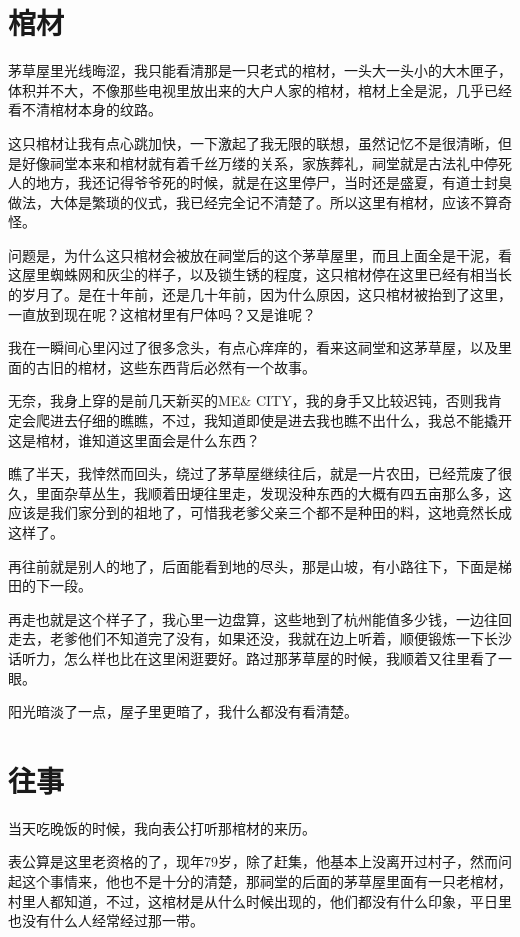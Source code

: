 \chapter{棺材}

茅草屋里光线晦涩，我只能看清那是一只老式的棺材，一头大一头小的大木匣子，体积并不大，不像那些电视里放出来的大户人家的棺材，棺材上全是泥，几乎已经看不清棺材本身的纹路。

这只棺材让我有点心跳加快，一下激起了我无限的联想，虽然记忆不是很清晰，但是好像祠堂本来和棺材就有着千丝万缕的关系，家族葬礼，祠堂就是古法礼中停死人的地方，我还记得爷爷死的时候，就是在这里停尸，当时还是盛夏，有道士封臭做法，大体是繁琐的仪式，我已经完全记不清楚了。所以这里有棺材，应该不算奇怪。

问题是，为什么这只棺材会被放在祠堂后的这个茅草屋里，而且上面全是干泥，看这屋里蜘蛛网和灰尘的样子，以及锁生锈的程度，这只棺材停在这里已经有相当长的岁月了。是在十年前，还是几十年前，因为什么原因，这只棺材被抬到了这里，一直放到现在呢？这棺材里有尸体吗？又是谁呢？

我在一瞬间心里闪过了很多念头，有点心痒痒的，看来这祠堂和这茅草屋，以及里面的古旧的棺材，这些东西背后必然有一个故事。

无奈，我身上穿的是前几天新买的ME\& CITY，我的身手又比较迟钝，否则我肯定会爬进去仔细的瞧瞧，不过，我知道即使是进去我也瞧不出什么，我总不能撬开这是棺材，谁知道这里面会是什么东西？

瞧了半天，我悻然而回头，绕过了茅草屋继续往后，就是一片农田，已经荒废了很久，里面杂草丛生，我顺着田埂往里走，发现没种东西的大概有四五亩那么多，这应该是我们家分到的祖地了，可惜我老爹父亲三个都不是种田的料，这地竟然长成这样了。

再往前就是别人的地了，后面能看到地的尽头，那是山坡，有小路往下，下面是梯田的下一段。

再走也就是这个样子了，我心里一边盘算，这些地到了杭州能值多少钱，一边往回走去，老爹他们不知道完了没有，如果还没，我就在边上听着，顺便锻炼一下长沙话听力，怎么样也比在这里闲逛要好。路过那茅草屋的时候，我顺着又往里看了一眼。

阳光暗淡了一点，屋子里更暗了，我什么都没有看清楚。

\chapter{往事}

当天吃晚饭的时候，我向表公打听那棺材的来历。

表公算是这里老资格的了，现年79岁，除了赶集，他基本上没离开过村子，然而问起这个事情来，他也不是十分的清楚，那祠堂的后面的茅草屋里面有一只老棺材，村里人都知道，不过，这棺材是从什么时候出现的，他们都没有什么印象，平日里也没有什么人经常经过那一带。

